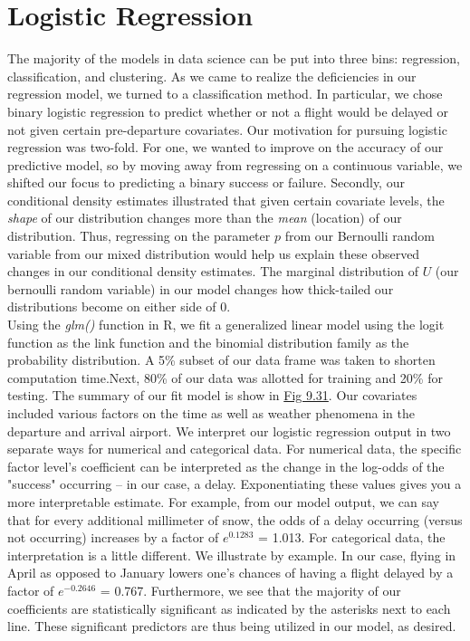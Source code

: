 \documentclass[12pt, a4paper, openany]{book}
\newcommand\tab[1][1cm]{\hspace*{#1}}
\begin{document}
	\section{Logistic Regression}
	\tab The majority of the models in data science can be put into three bins: regression, classification, and clustering. As we came to realize the deficiencies in our regression model, we turned to a classification method. In particular, we chose binary logistic regression to predict whether or not a flight would be delayed or not given certain pre-departure covariates. Our motivation for pursuing logistic regression was two-fold. For one, we wanted to improve on the accuracy of our predictive model, so by moving away from regressing on a continuous variable, we shifted our focus to predicting a binary success or failure. Secondly, our conditional density estimates illustrated that given certain covariate levels, the \textit{shape} of our distribution changes more than the \textit{mean} (location) of our distribution. Thus, regressing on the parameter $p$ from our Bernoulli random variable from our mixed distribution would help us explain these observed changes in our conditional density estimates. The marginal distribution of $U$ (our bernoulli random variable) in our model changes how thick-tailed our distributions become on either side of 0. \\
	\tab Using the \textit{glm()} function in R, we fit a generalized linear model using the logit function as the link function and the binomial distribution family as the probability distribution. A 5\% subset of our data frame was taken to shorten computation time.Next, 80\% of our data was allotted for training and 20\% for testing. The summary of our fit model is show in \underline{Fig 9.31}. Our covariates included various factors on the time as well as weather phenomena in the departure and arrival airport. We interpret our logistic regression output in two separate ways for numerical and categorical data. For numerical data, the specific factor level’s coefficient can be interpreted as the change in the log-odds of the "success" occurring – in our case, a delay. Exponentiating these values gives you a more interpretable estimate. For example, from our model output, we can say that for every additional millimeter of snow, the odds of a delay occurring (versus not occurring) increases by a factor of $e^{0.1283}$ = 1.013. For categorical data, the interpretation is a little different. We illustrate by example. In our case, flying in April as opposed to January lowers one’s chances of having a flight delayed by a factor of $e^{-0.2646}$ = 0.767. Furthermore, we see that the majority of our coefficients are statistically significant as indicated by the asterisks next to each line. These significant predictors are thus being utilized in our model, as desired. \\
\end{document}
